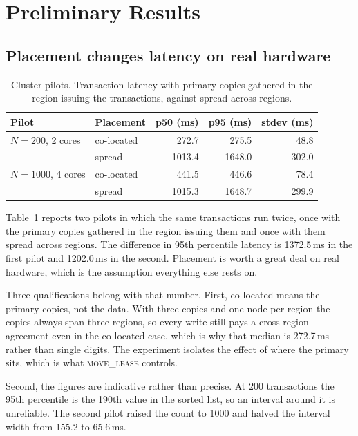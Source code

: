 \section{Preliminary Results}

\subsection{Placement changes latency on real hardware}

\begin{table}[t]
\caption{Cluster pilots. Transaction latency with primary copies gathered in
the region issuing the transactions, against spread across regions.}
\label{tab:cluster}
\centering
\footnotesize
\begin{tabular}{llrrr}
\toprule
Pilot & Placement & p50 (ms) & p95 (ms) & stdev (ms) \\
\midrule
$N=200$, 2 cores  & co-located &  272.7 &  275.5 &  48.8 \\
                  & spread     & 1013.4 & 1648.0 & 302.0 \\
\addlinespace
$N=1000$, 4 cores & co-located &  441.5 &  446.6 &  78.4 \\
                  & spread     & 1015.3 & 1648.7 & 299.9 \\
\bottomrule
\end{tabular}
\end{table}

Table~\ref{tab:cluster} reports two pilots in which the same transactions run
twice, once with the primary copies gathered in the region issuing them and
once with them spread across regions. The difference in 95th percentile
latency is 1372.5\,ms in the first pilot and 1202.0\,ms in the second.
Placement is worth a great deal on real hardware, which is the assumption
everything else rests on.

Three qualifications belong with that number. First, co-located means the
primary copies, not the data. With three copies and one node per region the
copies always span three regions, so every write still pays a cross-region
agreement even in the co-located case, which is why that median is 272.7\,ms
rather than single digits. The experiment isolates the effect of where the
primary sits, which is what \textsc{move\_lease} controls.

Second, the figures are indicative rather than precise. At 200 transactions
the 95th percentile is the 190th value in the sorted list, so an interval
around it is unreliable. The second pilot raised the count to 1000 and halved
the interval width from 155.2 to 65.6\,ms.

